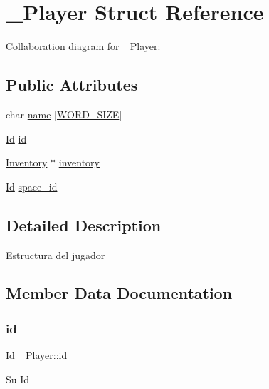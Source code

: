 \hypertarget{struct__Player}{}\section{\+\_\+\+Player Struct Reference}
\label{struct__Player}


Collaboration diagram for \+\_\+\+Player\+:
\subsection*{Public Attributes}
\begin{DoxyCompactItemize}
\item 
char \hyperlink{struct__Player_adda99df91c28eb58d392f2b43fc6898f}{name} \mbox{[}\hyperlink{types_8h_a92ed8507d1cd2331ad09275c5c4c1c89}{W\+O\+R\+D\+\_\+\+S\+I\+ZE}\mbox{]}
\item 
\hyperlink{types_8h_a845e604fb28f7e3d97549da3448149d3}{Id} \hyperlink{struct__Player_a60d635cd063816a9c1bd873f4868bb90}{id}
\item 
\hyperlink{inventory_8h_a2253bf64ac4ce6a9c1d6f39c0b0d32a3}{Inventory} $\ast$ \hyperlink{struct__Player_a5e02924cb82ca61f74ba414d190aa29b}{inventory}
\item 
\hyperlink{types_8h_a845e604fb28f7e3d97549da3448149d3}{Id} \hyperlink{struct__Player_aed09e7001b0005d679224be84e98d2a8}{space\+\_\+id}
\end{DoxyCompactItemize}


\subsection{Detailed Description}
Estructura del jugador 

\subsection{Member Data Documentation}
\mbox{\label{struct__Player_a60d635cd063816a9c1bd873f4868bb90}} 
\subsubsection{\texorpdfstring{id}{id}}
{\footnotesize\ttfamily \hyperlink{types_8h_a845e604fb28f7e3d97549da3448149d3}{Id} \+\_\+\+Player\+::id}

Su Id \mbox{\label{struct__Player_a5e02924cb82ca61f74ba414d190aa29b}} 
